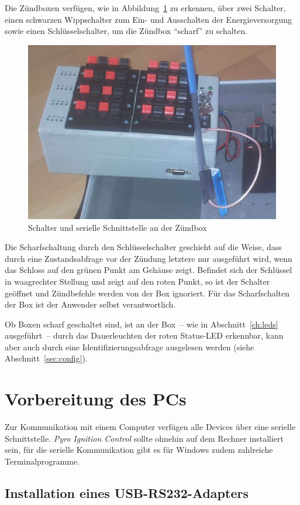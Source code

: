 \documentclass[paper=a4, parskip, numbers=noenddot, toc=listof, headsepline]{scrbook}
\newcommand{\pic}{\emph{Pyro Ignition Control}}
\begin{document}
			Die Zündboxen verfügen, wie in Abbildung~\ref{fig:schalterzuend} zu erkennen, über zwei Schalter, einen schwarzen Wippschalter zum Ein- und Ausschalten der Energieversorgung sowie einen Schlüsselschalter, um die Zündbox \enquote{scharf} zu schalten.

			\begin{figure}[!b]
				\centering
				\includegraphics[width=.6\textwidth]{Bilder/SchalterZuendbox}
				\caption{Schalter und serielle Schnittstelle an der Zündbox}
				\label{fig:schalterzuend}
			\end{figure}

			Die Scharfschaltung durch den Schlüsselschalter geschieht auf die Weise, dass durch eine Zustandsabfrage vor der Zündung letztere nur ausgeführt wird, wenn das Schloss auf den grünen Punkt am Gehäuse zeigt. Befindet sich der Schlüssel in waagrechter Stellung und zeigt auf den roten Punkt, so ist der Schalter geöffnet und Zündbefehle werden von der Box ignoriert. Für das Scharfschalten der Box ist der Anwender selbst verantwortlich.

			Ob Boxen scharf geschaltet sind, ist an der Box~-- wie in Abschnitt~\ref{ch:leds} ausgeführt~-- durch das Dauerleuchten der roten Status-LED erkennbar, kann aber auch durch eine Identifizierungsabfrage ausgelesen werden (siehe Abschnitt~\ref{sec:config}).

	\chapter{Vorbereitung des PCs}

		Zur Kommunikation mit einem Computer verfügen alle Devices über eine serielle Schnittstelle. {\pic} sollte ohnehin auf dem Rechner installiert sein, für die serielle Kommunikation gibt es für Windows zudem zahlreiche Terminalprogramme.

		\section{Installation eines USB-RS232-Adapters}
			\label{sec:usbadapter}
\end{document}
